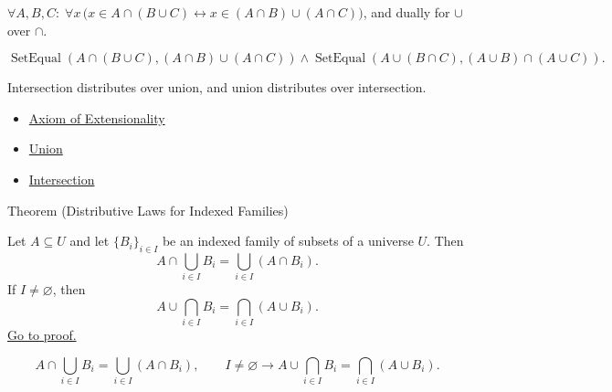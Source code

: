 \begin{remark*}
$\forall A, B, C:\; \forall x\,\bigl(x \in A \cap (B \cup C) \leftrightarrow x \in (A \cap B) \cup (A \cap C)\bigr)$, and dually for $\cup$ over $\cap$.
\end{remark*}

\begin{remark*}
\[
  \operatorname{SetEqual}(A\cap(B\cup C),(A\cap B)\cup(A\cap C))
  \wedge
  \operatorname{SetEqual}(A\cup(B\cap C),(A\cup B)\cap(A\cup C)).
\]
\end{remark*}

\begin{remark*}[Interpretation]
Intersection distributes over union, and union distributes over intersection.
\end{remark*}


\begin{dependencies}
\begin{itemize}
  \item \hyperref[ax:extensionality]{Axiom of Extensionality}
  \item \hyperref[def:union]{Union}
  \item \hyperref[def:intersection]{Intersection}
\end{itemize}
\end{dependencies}

\begin{theorembox}{Theorem (Distributive Laws for Indexed Families)}
\begin{theorem}\label{thm:indexed-distributivity}
Let $A\subseteq U$ and let $\{B_i\}_{i\in I}$ be an indexed family of subsets
of a universe $U$. Then
\[
A\cap\bigcup_{i\in I}B_i
=
\bigcup_{i\in I}(A\cap B_i).
\]
If $I\neq\varnothing$, then
\[
A\cup\bigcap_{i\in I}B_i
=
\bigcap_{i\in I}(A\cup B_i).
\]
\hyperref[prf:indexed-distributivity]{Go to proof.}
\end{theorem}
\end{theorembox}

\begin{remark*}
\[
  A\cap\bigcup_{i\in I}B_i
  =
  \bigcup_{i\in I}(A\cap B_i),
  \qquad
  I\neq\varnothing\to
  A\cup\bigcap_{i\in I}B_i
  =
  \bigcap_{i\in I}(A\cup B_i).
\]
\end{remark*}

